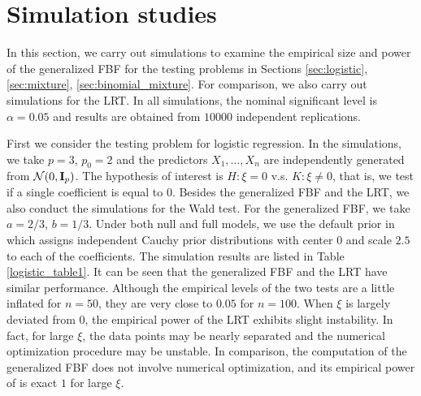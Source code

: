 \documentclass[11pt]{article}
\newcommand{\bfsym}[1]{\ensuremath{\boldsymbol{#1}}}
\def\bbeta{\bfsym \beta}
\theoremstyle{plain}
\theoremstyle{definition}
\theoremstyle{remark}
\begin{document}
\section{Simulation studies} \label{sec:simu}
In this section, we carry out simulations to examine the empirical size and power of the generalized FBF for the testing problems in Sections \ref{sec:logistic}, \ref{sec:mixture}, \ref{sec:binomial_mixture}.
For comparison, we also carry out simulations for the LRT.
In all simulations, the nominal significant level is $\alpha = 0.05$ and results are obtained from $10000$ independent replications.

First we consider the testing problem for logistic regression.
In the simulations, we take $p = 3$, $p_0 = 2$ and the predictors $X_1, \dots, X_n$ are independently generated from $\mathcal N (0, \mathbf{I}_p)$.
The hypothesis of interest is $H:\xi=0$ v.s. $K: \xi \neq 0$, that is, we test if a single coefficient is equal to $0$.
Besides the generalized FBF and the LRT, we also conduct the simulations for the Wald test.
For the generalized FBF, we take $a = 2/3$, $b = 1/3$.
Under both null and full models, we use the default prior in \cite{Gelman2008} which assigns independent Cauchy prior distributions with center $0$ and scale $2.5$ to each of the coefficients.
The simulation results are listed in Table \ref{logistic_table1}.
It can be seen that the generalized FBF and the LRT have similar performance.
Although the empirical levels of the two tests are a little inflated for $n=50$, they are very close to $0.05$ for $n=100$.
When $\xi$ is largely deviated from $0$, the empirical power of the LRT exhibits slight instability.
In fact, for large $\xi$, the data points may be nearly separated and the numerical optimization procedure may be unstable.
In comparison, the computation of the generalized FBF does not involve numerical optimization,  and its empirical power of is exact $1$ for large $\xi$.
\end{document}
